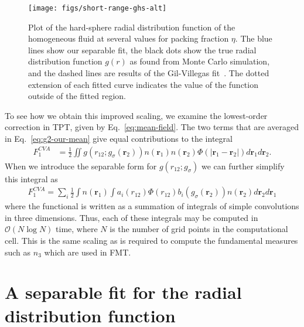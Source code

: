 \documentclass[letterpaper,twocolumn,amsmath,amssymb,pre,aps,10pt]{revtex4-1}
\newcommand{\rr}{\textbf{r}}
\begin{document}
\begin{figure}
  \centering
  \texttt{[image: figs/short-range-ghs-alt]}
  \caption{Plot of the hard-sphere radial distribution function of the
    homogeneous fluid at several values for packing fraction $\eta$. The
    blue lines show our separable fit, the black dots show the true
    radial distribution function $g(r)$ as found from Monte Carlo
    simulation, and the dashed lines are results of the
    Gil-Villegas fit~\cite{gil1997statistical}.  The dotted extension
    of each fitted curve indicates the value of the function outside
    of the fitted region.  }\label{fig:radial-distribution}
\end{figure}

To see how we obtain this improved scaling, we examine the
lowest-order correction in TPT, given by Eq.~\ref{eq:mean-field}.  The
two terms that are averaged in Eq.~\ref{eq:g2-our-mean} give equal
contributions to the integral
\begin{align}
  F_1^{\textit{CVA}} &= \tfrac12 \!\! \iint \!\!
  g(r_{12};g_\sigma(\rr_2))n(\rr_1)n(\rr_2)\Phi(|\rr_1-\rr_2|)
  d\rr_1d\rr_2.
\end{align}
When we introduce the separable form for $g(r_{12};g_\sigma)$ we can
further simplify this integral as
\begin{align}
  F_1^{\textit{CVA}} \! = \!
  \sum_i \!\tfrac12 \!\! \int \!\! n(\rr_1) \!\!
                            \int \!\!\!
                            a_i(r_{12})\Phi(r_{12})
                            b_i(
g_\sigma(\rr_2))n(\rr_2)
  d\rr_2d\rr_1
\end{align}
where the functional is written as a summation of integrals of simple
convolutions in three dimensions.  Thus, each of these integrals may
be computed in $\mathcal{O}(N\log N)$ time, where $N$ is the number of
grid points in the computational cell.  This is the same scaling as is
required to compute the fundamental measures such as $n_3$ which are
used in FMT.

\section{A separable fit for the radial distribution function}\label{sec:separable-fit}
\end{document}
